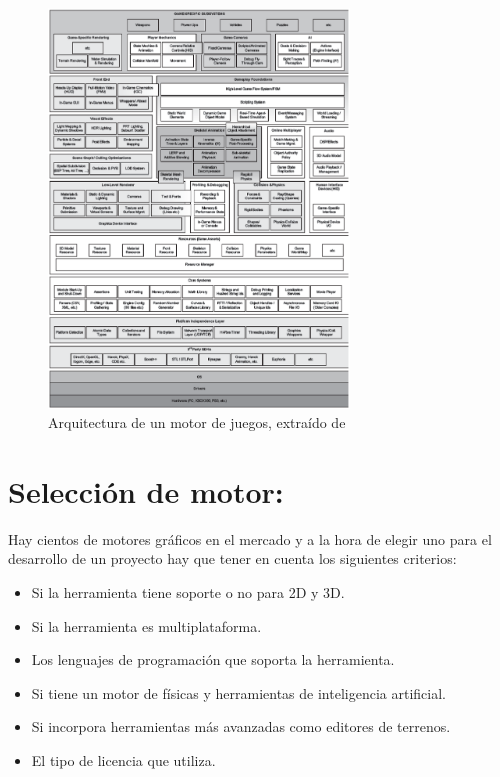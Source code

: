 \begin{figure}[h!]

	\centering
	\includegraphics[width=8cm]{./eps/fig3.eps}
	\caption{Arquitectura de un motor de juegos, extraído de \cite{B9}}
	\label{Figura3}

\end{figure}
\newpage

\section{Selección de motor:}
Hay cientos de motores gráficos en el mercado y a la hora de elegir uno para el desarrollo de un proyecto hay que tener en cuenta los siguientes criterios:\cite{B7}

\begin{itemize}

	\item Si la herramienta tiene soporte o no para 2D y 3D.
	\item Si la herramienta es multiplataforma.
	\item Los lenguajes de programación que soporta la herramienta.
	\item Si tiene un motor de físicas y herramientas de inteligencia artificial.
	\item Si incorpora herramientas más avanzadas como editores de terrenos.
	\item El tipo de licencia que utiliza. 

\end{itemize}

